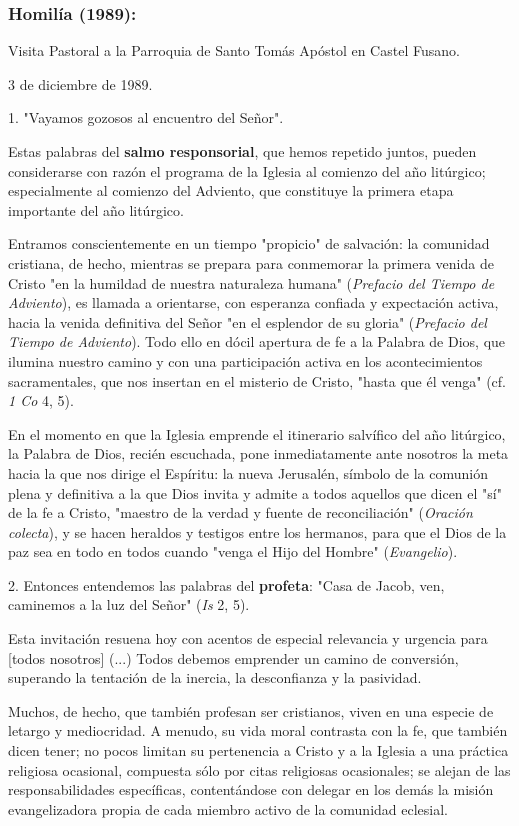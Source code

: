 \subsubsection{Homilía (1989): } Visita Pastoral a la Parroquia de Santo Tomás Apóstol en Castel Fusano.

3 de diciembre de 1989.

\begin{body} 
1. "Vayamos gozosos al encuentro del Señor".

Estas palabras del \textbf{salmo responsorial}, que hemos repetido juntos, pueden considerarse con razón el programa de la Iglesia al comienzo del año litúrgico; especialmente al comienzo del Adviento, que constituye la primera etapa importante del año litúrgico.

Entramos conscientemente en un tiempo "propicio" de salvación: la comunidad cristiana, de hecho, mientras se prepara para conmemorar la primera venida de Cristo "en la humildad de nuestra naturaleza humana" (\emph{Prefacio del Tiempo de Adviento}), es llamada a orientarse, con esperanza confiada y expectación activa, hacia la venida definitiva del Señor "en el esplendor de su gloria" (\emph{Prefacio del Tiempo de Adviento}). Todo ello en dócil apertura de fe a la Palabra de Dios, que ilumina nuestro camino y con una participación activa en los acontecimientos sacramentales, que nos insertan en el misterio de Cristo, "hasta que él venga" (cf. \emph{1 Co} 4, 5).

En el momento en que la Iglesia emprende el itinerario salvífico del año litúrgico, la Palabra de Dios, recién escuchada, pone inmediatamente ante nosotros la meta hacia la que nos dirige el Espíritu: la nueva Jerusalén, símbolo de la comunión plena y definitiva a la que Dios invita y admite a todos aquellos que dicen el "sí" de la fe a Cristo, "maestro de la verdad y fuente de reconciliación" (\emph{Oración colecta}), y se hacen heraldos y testigos entre los hermanos, para que el Dios de la paz sea en todo en todos cuando "venga el Hijo del Hombre" (\emph{Evangelio}).

2. Entonces entendemos las palabras del \textbf{profeta}: "Casa de Jacob, ven, caminemos a la luz del Señor" (\emph{Is} 2, 5).

Esta invitación resuena hoy con acentos de especial relevancia y urgencia para {[}todos nosotros{]} (...) Todos debemos emprender un camino de conversión, superando la tentación de la inercia, la desconfianza y la pasividad.

Muchos, de hecho, que también profesan ser cristianos, viven en una especie de letargo y mediocridad. A menudo, su vida moral contrasta con la fe, que también dicen tener; no pocos limitan su pertenencia a Cristo y a la Iglesia a una práctica religiosa ocasional, compuesta sólo por citas religiosas ocasionales; se alejan de las responsabilidades específicas, contentándose con delegar en los demás la misión evangelizadora propia de cada miembro activo de la comunidad eclesial.


\end{body}
